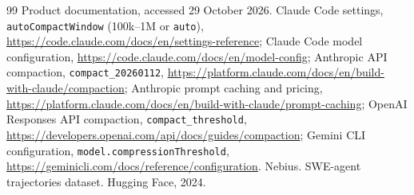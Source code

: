 \documentclass[11pt]{article}
\begin{document}
\begin{thebibliography}{99}
 Product documentation, accessed 29 October 2026. Claude Code settings, \texttt{autoCompactWindow} (100k--1M or \texttt{auto}), \url{https://code.claude.com/docs/en/settings-reference}; Claude Code model configuration, \url{https://code.claude.com/docs/en/model-config}; Anthropic API compaction, \texttt{compact\_20260112}, \url{https://platform.claude.com/docs/en/build-with-claude/compaction}; Anthropic prompt caching and pricing, \url{https://platform.claude.com/docs/en/build-with-claude/prompt-caching}; OpenAI Responses API compaction, \texttt{compact\_threshold}, \url{https://developers.openai.com/api/docs/guides/compaction}; Gemini CLI configuration, \texttt{model.compressionThreshold}, \url{https://geminicli.com/docs/reference/configuration}.
 Nebius. SWE-agent trajectories dataset. Hugging Face, 2024.
\end{thebibliography}
\end{document}
